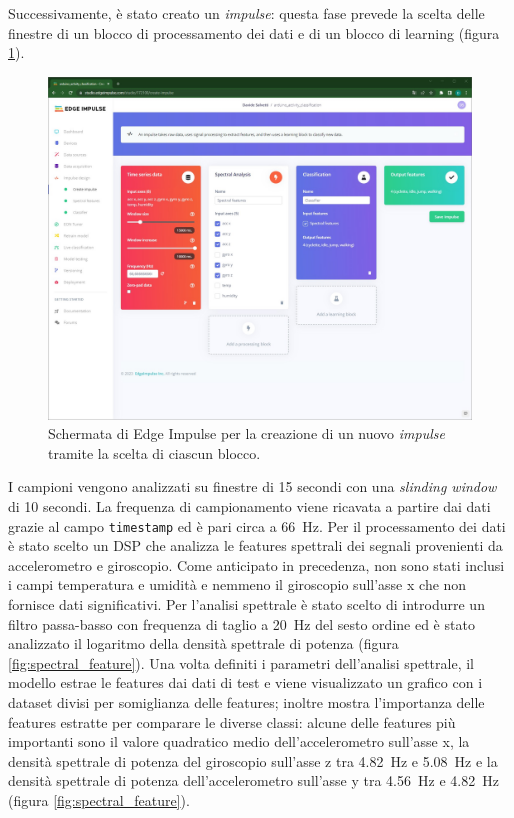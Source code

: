 Successivamente, è stato creato un \textit{impulse}: questa fase prevede la scelta delle finestre di un blocco di processamento dei dati e di un blocco di learning (figura \ref{fig:creazione_impulse}).
\begin{figure}[b!]
	\centering
	\includegraphics[width=0.5\linewidth]{./ImageFiles/creazione_impulse.jpg}
	\caption{Schermata di Edge Impulse per la creazione di un nuovo \textit{impulse} tramite la scelta di ciascun blocco.}
	\label{fig:creazione_impulse}
\end{figure}
I campioni vengono analizzati su finestre di 15 secondi con una \textit{slinding window} di 10 secondi. La frequenza di campionamento viene ricavata a partire dai dati grazie al campo \texttt{timestamp} ed è pari circa a \SI{66}{\hertz}.
Per il processamento dei dati è stato scelto un DSP che analizza le features spettrali dei segnali provenienti da accelerometro e giroscopio. Come anticipato in precedenza, non sono stati inclusi i campi temperatura e umidità e nemmeno il giroscopio sull'asse x che non fornisce dati significativi.
Per l'analisi spettrale è stato scelto di introdurre un filtro passa-basso con frequenza di taglio a \SI{20}{\hertz} del sesto ordine ed è stato analizzato il logaritmo della densità spettrale di potenza (figura \ref{fig:spectral_feature}). Una volta definiti i parametri dell'analisi spettrale, il modello estrae le features dai dati di test e viene visualizzato un grafico con i dataset divisi per somiglianza delle features; inoltre mostra l'importanza delle features estratte per comparare le diverse classi: alcune delle features più importanti sono il valore quadratico medio dell'accelerometro sull'asse x, la densità spettrale di potenza del giroscopio sull'asse z tra \SI{4.82}{\hertz} e \SI{5.08}{\hertz} e la densità spettrale di potenza dell'accelerometro sull'asse y tra \SI{4.56}{\hertz} e \SI{4.82}{\hertz} (figura \ref{fig:spectral_feature}). 
